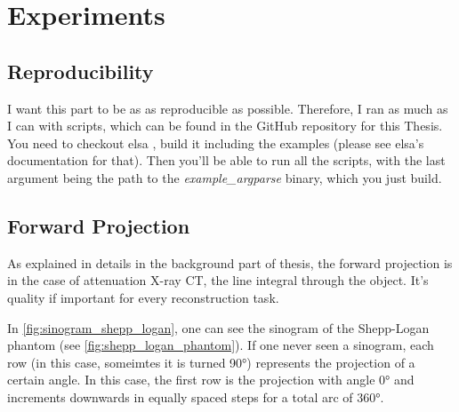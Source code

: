 \chapter{Experiments}\label{chap:experiments}

\section{Reproducibility}\label{sec:experiments_repoduction}

I want this part to be as as reproducible as possible. Therefore, I ran as much as I can with
scripts, which can be found in the GitHub repository for this Thesis. You need to checkout elsa
, build it including the examples (please see elsa's documentation for that).
Then you'll be able to run all the scripts, with the last argument being the path to the
\textit{example\_argparse} binary, which you just build.

\section{Forward Projection}\label{sec:experiments_forward_projection}


As explained in details in the background part of thesis, the forward projection is in the case of
attenuation X-ray CT, the line integral through the object. It's quality if important for every
reconstruction task.

In \autoref{fig:sinogram_shepp_logan}, one can see the sinogram of the Shepp-Logan phantom
 (see \autoref{fig:shepp_logan_phantom}). If one never
seen a sinogram, each row (in this case, someimtes it is turned 90°) represents the projection of a
certain angle. In this case, the first row is the projection with angle 0° and increments downwards
in equally spaced steps for a total arc of 360°.


